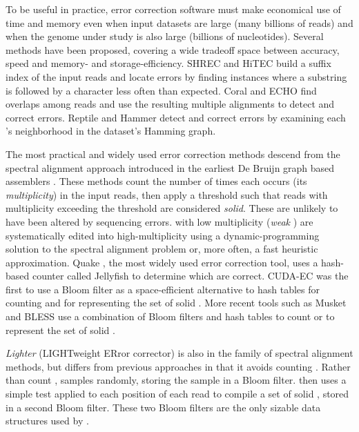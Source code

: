 \documentclass{bmcart}
\begin{document}
To be useful in practice, error correction software must make economical use of time and memory even when input datasets are large (many billions of reads) and when the genome under study is also large (billions of nucleotides).
Several methods have been proposed, covering a wide tradeoff space between accuracy, speed and memory- and storage-efficiency.
SHREC \cite{schroder2009shrec} and HiTEC \cite{ilie2011hitec} build a suffix index of the input reads and locate errors by finding instances where a substring is followed by a character less often than expected.
Coral \cite{salmela2011correcting} and ECHO \cite{kao2011echo} find overlaps among reads and use the resulting multiple alignments to detect and correct errors.
Reptile \cite{yang2010reptile} and Hammer \cite{medvedev2011error} detect and correct errors by examining each \kmer's neighborhood in the dataset's \kmer Hamming graph.

The most practical and widely used error correction methods descend from the spectral alignment approach introduced in the earliest De Bruijn graph based assemblers \cite{pevzner2001eulerian, chaisson2004fragment}.
These methods count the number of times each \kmer occurs (its \emph{multiplicity}) in the input reads, then apply a threshold such that reads with multiplicity exceeding the threshold are considered \emph{solid}.
These \kmers are unlikely to have been altered by sequencing errors.
\kmers with low multiplicity (\emph{weak} \kmers) are systematically edited into high-multiplicity \kmers using a dynamic-programming solution to the spectral alignment problem \cite{pevzner2001eulerian, chaisson2004fragment} or, more often, a fast heuristic approximation.
Quake \cite{kelley2010quake}, the most widely used error correction tool, uses a hash-based \kmer counter called Jellyfish \cite{marccais2011fast} to determine which \kmers are correct.
CUDA-EC \cite{shi2010parallel} was the first to use a Bloom filter as a space-efficient alternative to hash tables for counting \kmers and for representing the set of solid \kmers.
More recent tools such as Musket \cite{liu2013musket} and BLESS \cite{heo2014bless} use a combination of Bloom filters and hash tables to count \kmers or to represent the set of solid \kmers.

\emph{Lighter} (LIGHTweight ERror corrector) is also in the family of spectral alignment methods, but differs from previous approaches in that it avoids counting \kmers.
Rather than count \kmers, \tool samples \kmers randomly, storing the sample in a Bloom filter.
\tool then uses a simple test applied to each position of each read to compile a set of solid \kmers, stored in a second Bloom filter.
These two Bloom filters are the only sizable data structures used by \tool.
\end{document}
